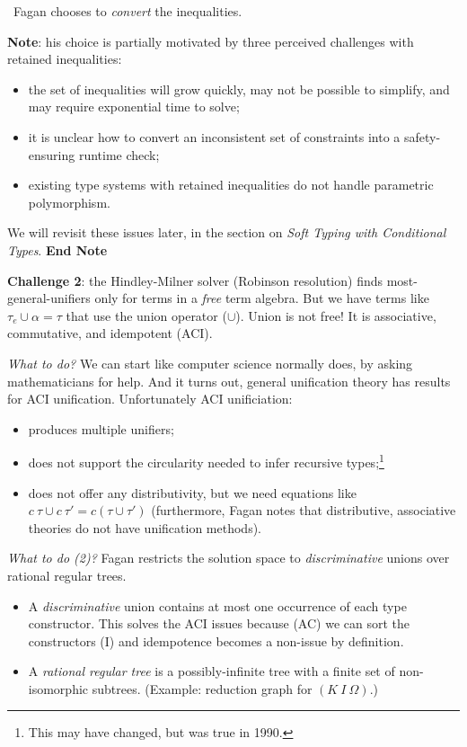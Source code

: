 \documentclass{article}
\begin{document}
\noindent \lefthand~Fagan chooses to \emph{convert} the inequalities.

\noindent \textbf{Note}: his choice is partially motivated by three perceived
 challenges with retained inequalities:
\begin{itemize}
\item
  the set of inequalities will grow quickly, may not be possible to simplify, and may require exponential time to solve;
\item
  it is unclear how to convert an inconsistent set of constraints into a safety-ensuring runtime check;
\item
  existing type systems with retained inequalities do not handle parametric polymorphism.
\end{itemize}

We will revisit these issues later, in the section on \emph{Soft Typing with
 Conditional Types}.
\textbf{End Note}

\noindent \textbf{Challenge 2}: the Hindley-Milner solver (Robinson resolution)
 finds most-general-unifiers only for terms in a \emph{free} term algebra.
But we have terms like $\tau_e \cup \alpha = \tau$ that use the union operator ($\cup$).
Union is not free!
It is associative, commutative, and idempotent (ACI).

\noindent \emph{What to do?}
We can start like computer science normally does, by asking mathematicians for
 help.
And it turns out, general unification theory has results for ACI unification.
Unfortunately ACI unificiation:
\begin{itemize}
\item
  produces multiple unifiers;
\item
  does not support the circularity needed to infer recursive types;\footnote{This may have changed, but was true in 1990.}
\item
  does not offer any distributivity, but we need equations like $c~\tau \cup c~\tau' = c(\tau \cup \tau')$
  (furthermore, Fagan notes that distributive, associative theories do not have unification methods).
\end{itemize}


\noindent \emph{What to do (2)?}
Fagan restricts the solution space to \emph{discriminative} unions over rational
 regular trees.
\begin{itemize}
\item
  A \emph{discriminative} union contains at most one occurrence of each type constructor.
  This solves the ACI issues because (AC) we can sort the constructors (I) and
  idempotence becomes a non-issue by definition.
\item
  A \emph{rational regular tree} is a possibly-infinite tree with a finite set
  of non-isomorphic subtrees. (Example: reduction graph for $(K~I~\Omega)$.)
\end{itemize}
\end{document}
